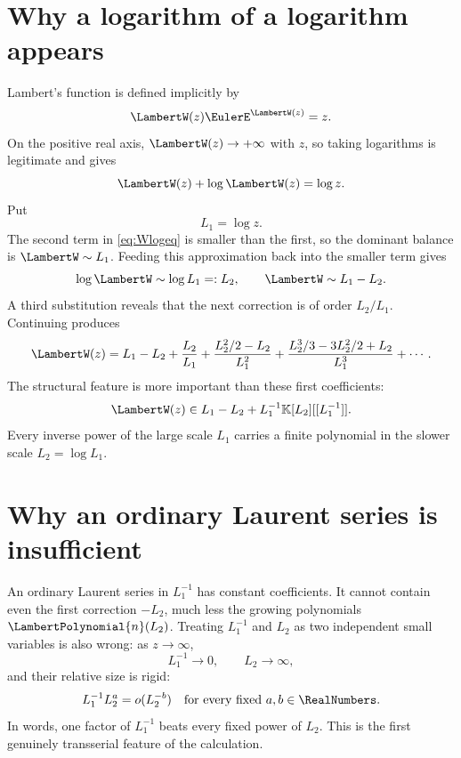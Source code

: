\documentclass[11pt,oneside,openany]{book}
\newcommand{\K}{\mathbb{K}}
\begin{document}
\section{Why a logarithm of a logarithm appears}
Lambert's function is defined implicitly by
\begin{equation}\label{eq:Wdef}
  \LambertW(z)\EulerE^{\LambertW(z)}=z.
\end{equation}
On the positive real axis, \(\LambertW(z)\to+\infty\) with \(z\), so taking logarithms
is legitimate and gives
\begin{equation}\label{eq:Wlogeq}
  \LambertW(z)+\log \LambertW(z)=\log z.
\end{equation}
Put
\[
  L_1=\log z.
\]
The second term in \cref{eq:Wlogeq} is smaller than the first, so the dominant
balance is \(\LambertW\sim L_1\).  Feeding this approximation back into the smaller
term gives
\[
  \log \LambertW\sim\log L_1=:L_2,
  \qquad
  \LambertW\sim L_1-L_2.
\]
A third substitution reveals that the next correction is of order
\(L_2/L_1\).  Continuing produces
\begin{equation}\label{eq:Wshape}
  \LambertW(z)=L_1-L_2+
  \frac{L_2}{L_1}+
  \frac{L_2^2/2-L_2}{L_1^2}+
  \frac{L_2^3/3-3L_2^2/2+L_2}{L_1^3}+\cdots.
\end{equation}
The structural feature is more important than these first coefficients:
\begin{equation}\label{eq:Wcoset}
  \LambertW(z)\in
  L_1-L_2+L_1^{-1}\K[L_2][[L_1^{-1}]].
\end{equation}
Every inverse power of the large scale \(L_1\) carries a finite polynomial in
the slower scale \(L_2=\log L_1\).

\section{Why an ordinary Laurent series is insufficient}
An ordinary Laurent series in \(L_1^{-1}\) has constant coefficients.  It
cannot contain even the first correction \(-L_2\), much less the growing
polynomials \(\LambertPolynomial{n}(L_2)\).  Treating \(L_1^{-1}\) and \(L_2\) as two independent
small variables is also wrong: as \(z\to\infty\),
\[
  L_1^{-1}\to0,
  \qquad
  L_2\to\infty,
\]
and their relative size is rigid:
\begin{equation}\label{eq:scalehierarchyW}
  L_1^{-1}L_2^a=o(L_2^{-b})
  \quad\text{for every fixed }a,b\in\RealNumbers.
\end{equation}
In words, one factor of \(L_1^{-1}\) beats every fixed power of \(L_2\).  This
is the first genuinely transserial feature of the calculation.
\end{document}
